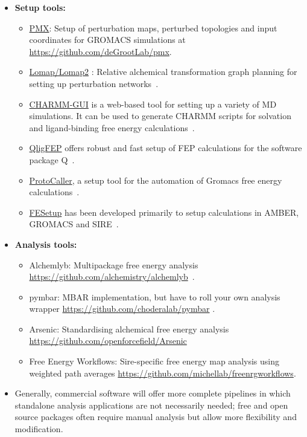 \documentclass[9pt,bestpractices,pubversion]{livecoms}
\begin{document}
\begin{itemize}
\item[] \textbf{Setup tools:}
	\begin{itemize}
	\item \href{http://pmx.mpibpc.mpg.de/instructions.html}{PMX}: Setup of perturbation maps, perturbed topologies and input coordinates for GROMACS simulations at \url{https://github.com/deGrootLab/pmx}.
	\item \href{https://github.com/MobleyLab/Lomap}{Lomap/Lomap2} : Relative alchemical transformation graph planning for setting up perturbation networks~\cite{liu2013lead}.
	\item \href{http://www.charmm-gui.org/}{CHARMM-GUI} is a web-based tool for setting up a variety of MD simulations. It can be used to generate CHARMM scripts for solvation and ligand-binding free energy calculations~\cite{jo2008charmmgui}.
	\item \href{https://github.com/qusers/qligfep}{QligFEP} offers robust and fast setup of FEP calculations for the software package Q~\cite{jespers2019qligfep}.
	\item \href{https://github.com/protocaller/ProtoCaller}{ProtoCaller}, a setup tool for the automation of Gromacs free energy calculations~\cite{suruzhon2020protocaller}.
	\item \href{https://fesetup.readthedocs.io/en/latest/introduction.html}{FESetup} has been developed primarily to setup calculations in AMBER, GROMACS and SIRE~\cite{loeffler2015fesetup}.
	\end{itemize}
\item []\textbf{Analysis tools:}
	\begin{itemize}

	\item Alchemlyb: Multipackage free energy analysis
	\url{https://github.com/alchemistry/alchemlyb}~\cite{daviddotson2020alchemistry}.
	\item pymbar: MBAR implementation, but have to roll your own analysis wrapper      
	\url{https://github.com/choderalab/pymbar} \cite{shirts2008statisticallya}.
	\item Arsenic: Standardising alchemical free energy analysis \url{https://github.com/openforcefield/Arsenic}
	\item Free Energy Workflows: Sire-specific free energy map analysis using weighted path averages \url{https://github.com/michellab/freenrgworkflows}.
	\end{itemize}
\item[] Generally, commercial software will offer more complete pipelines in which standalone analysis applications are not necessarily needed; free and open source packages often require manual analysis but allow more flexibility and modification.
\end{itemize}
\end{document}
